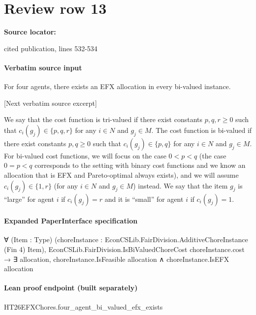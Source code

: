 \documentclass[10pt]{article}
\begin{document}
\section*{Review row 13}
\textbf{Source locator:} {\footnotesize\raggedright cited publication, lines 532-\allowbreak{}534\par}
\paragraph{Verbatim source input}
\begin{ReviewVerbatim}
\begin{theorem}\label{thm:four}
    For four agents, there exists an EFX allocation in every bi-valued instance.
\end{theorem}

[Next verbatim source excerpt]

We say that the cost function is tri-valued if there exist constants $p,q,r\geq 0$ such that $c_i(g_j)\in\{p,q,r\}$ for any $i\in N$ and $g_j\in M$.
The cost function is bi-valued if there exist constants $p,q\geq 0$ such that $c_i(g_j)\in\{p,q\}$ for any $i\in N$ and $g_j\in M$.
For bi-valued cost functions, we will focus on the case $0<p<q$ (the case $0=p<q$ corresponds to the setting with binary cost functions and we know an allocation that is EFX and Pareto-optimal always exists), and we will assume $c_i(g_j)\in\{1,r\}$ (for any $i\in N$ and $g_j\in M$) instead.
We say that the item $g_j$ is ``large'' for agent $i$ if $c_i(g_j)=r$ and it is ``small'' for agent $i$ if $c_i(g_j)=1$.
\end{ReviewVerbatim}


\paragraph{Expanded PaperInterface specification}
\begin{ReviewVerbatim}
∀ (Item : Type) (choreInstance : EconCSLib.FairDivision.AdditiveChoreInstance (Fin 4) Item),
  EconCSLib.FairDivision.IsBiValuedChoreCost choreInstance.cost →
    ∃ allocation, choreInstance.IsFeasible allocation ∧ choreInstance.IsEFX allocation
\end{ReviewVerbatim}

\paragraph{Lean proof endpoint (built separately)}\begin{ReviewVerbatim}
HT26EFXChores.four_agent_bi_valued_efx_exists
\end{ReviewVerbatim}
\end{document}

